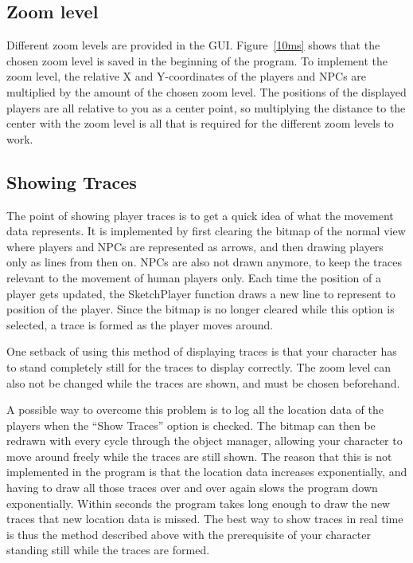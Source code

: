 \subsection{Zoom level}
Different zoom levels are provided in the GUI. Figure~\ref{10ms} shows that the chosen zoom level is saved in the beginning of the program. To implement the zoom level, the relative X and Y-coordinates of the players and NPCs are multiplied by the amount of the chosen zoom level. 
The positions of the displayed players are all relative to you as a center point, so multiplying the distance to the center with the zoom level is all that is required for the different zoom levels to work.

\subsection{Showing Traces} %
The point of showing player traces is to get a quick idea of what the movement data represents. It is implemented by first clearing the bitmap of the normal view where players and NPCs are represented as arrows, and then drawing players only as lines from then on. NPCs are also not drawn anymore, to keep the traces relevant to the movement of human players only. Each time the position of a player gets updated, the SketchPlayer function draws a new line to represent to position of the player. Since the bitmap is no longer cleared while this option is selected, a trace is formed as the player moves around.

One setback of using this method of displaying traces is that your character has to stand completely still for the traces to display correctly. The zoom level can also not be changed while the traces are shown, and must be chosen beforehand. 

A possible way to overcome this problem is to log all the location data of the players when the ``Show Traces'' option is checked. The bitmap can then be redrawn with every cycle through the object manager, allowing your character to move around freely while the traces are still shown. The reason that this is not implemented in the program is that the location data increases exponentially, and having to draw all those traces over and over again slows the program down exponentially. Within seconds the program takes long enough to draw the new traces that new location data is missed. The best way to show traces in real time is thus the method described above with the prerequisite of your character standing still while the traces are formed.

